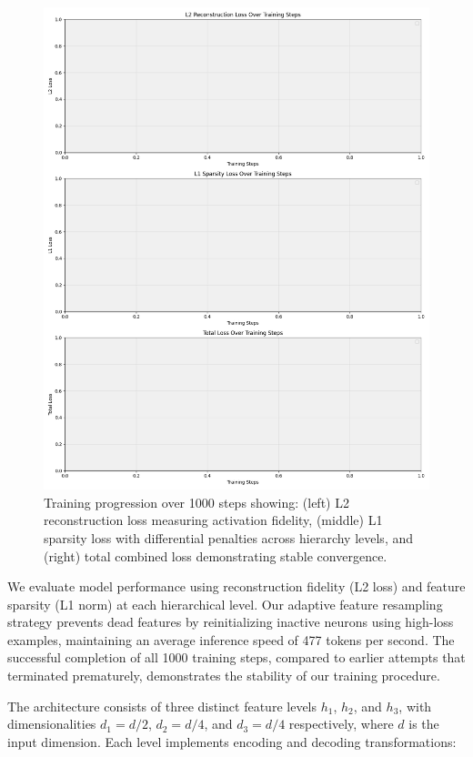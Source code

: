 \begin{figure}[t]
\centering
\includegraphics[width=\linewidth]{training_curves.png}
\caption{Training progression over 1000 steps showing: (left) L2 reconstruction loss measuring activation fidelity, (middle) L1 sparsity loss with differential penalties across hierarchy levels, and (right) total combined loss demonstrating stable convergence.}
\label{fig:training_curves}
\end{figure}

We evaluate model performance using reconstruction fidelity (L2 loss) and feature sparsity (L1 norm) at each hierarchical level. Our adaptive feature resampling strategy prevents dead features by reinitializing inactive neurons using high-loss examples, maintaining an average inference speed of 477 tokens per second. The successful completion of all 1000 training steps, compared to earlier attempts that terminated prematurely, demonstrates the stability of our training procedure.

The architecture consists of three distinct feature levels $h_1$, $h_2$, and $h_3$, with dimensionalities $d_1 = d/2$, $d_2 = d/4$, and $d_3 = d/4$ respectively, where $d$ is the input dimension. Each level implements encoding and decoding transformations:

